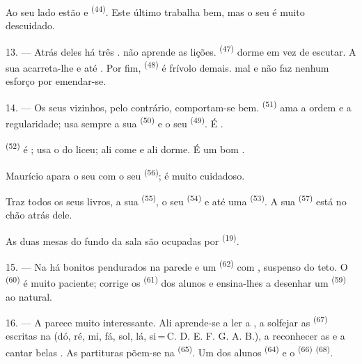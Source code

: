 Ao seu lado estão  e  \textsuperscript{(44)}. Este
último trabalha bem, mas o seu  é muito descuidado.

13. --- Atrás deles há três .  não aprende
as lições.  \textsuperscript{(47)} dorme em vez de escutar. A sua
 acarreta-lhe  e até .
Por fim,  \textsuperscript{(48)} é frívolo demais.
 mal e não faz nenhum esforço por emendar-se.

14. --- Os seus vizinhos, pelo contrário, comportam-se bem.
 \textsuperscript{(51)} ama a ordem e a regularidade; usa sempre
a sua  \textsuperscript{(50)} e o seu 
\textsuperscript{(49)}. É .

 \textsuperscript{(52)} é ; usa o 
do liceu; ali come e ali dorme. É um bom .

Maurício apara o seu  com o seu 
\textsuperscript{(56)}; é muito cuidadoso.

Traz todos os seus livros, a sua  \textsuperscript{(55)}, o seu
 \textsuperscript{(54)} e até uma  \textsuperscript{(53)}. A sua 
\textsuperscript{(57)} está no chão atrás dele.

As duas mesas do fundo da sala são ocupadas por 
\textsuperscript{(19)}.

\VUsaut{4.6mm}
\VUsaut{3.4mm}

15. --- Na  há bonitos  pendurados na
parede e um  \textsuperscript{(62)} com ,
suspenso do teto. O  \textsuperscript{(60)} é muito paciente;
corrige os  \textsuperscript{(61)} dos alunos e ensina-lhes a
desenhar um  \textsuperscript{(59)} ao natural.

16. --- A  parece muito interessante. Ali aprende-se
a ler a , a solfejar as 
\textsuperscript{(67)} escritas na  (dó, ré, mi, fá, sol, lá,
si\,=\,C. D. E. F. G. A. B.), a reconhecer as  e a cantar
belas . As partituras põem-se na 
\textsuperscript{(65)}. Um dos alunos  \textsuperscript{(64)} e o
 \textsuperscript{(66)} 
\textsuperscript{(68)}.

